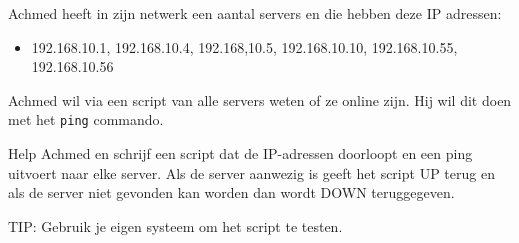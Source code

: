 Achmed heeft in zijn netwerk een aantal servers en die hebben deze IP adressen:
\begin{itemize}
\item 192.168.10.1, 192.168.10.4, 192.168,10.5, 192.168.10.10, 192.168.10.55, 192.168.10.56
\end{itemize}

Achmed wil via een script van alle servers weten of ze online zijn. Hij wil dit doen met het \texttt{ping} commando.

Help Achmed en schrijf een script dat de IP-adressen doorloopt en een ping uitvoert naar elke server. Als de server aanwezig is geeft het script UP terug en als de server niet gevonden kan worden dan wordt DOWN teruggegeven.

TIP: Gebruik je eigen systeem om het script te testen.

